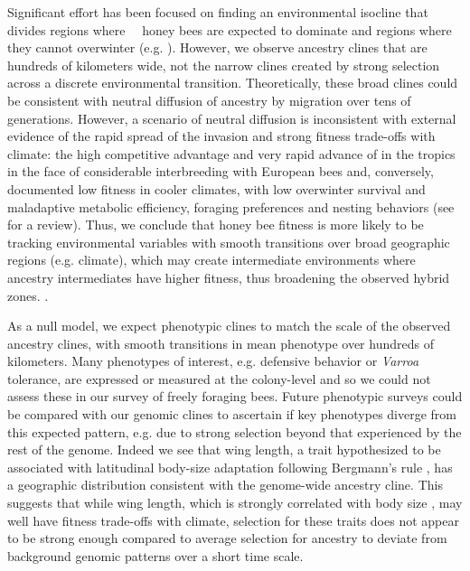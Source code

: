 Significant effort has been focused on finding an environmental isocline that divides regions where \africanized\ \hyb\ honey bees are expected to dominate and regions where they cannot overwinter (e.g. \cite{TaylorJr:1984vg, Southwick:1990cq, Sheppard:1991ep, Harrison:2006gk}). However, we observe ancestry clines that are hundreds of kilometers wide, not the narrow clines created by strong selection across a discrete environmental transition. Theoretically, these broad clines could be consistent with neutral diffusion of ancestry by migration over tens of generations. However, a scenario of neutral diffusion is inconsistent with external evidence of the rapid spread of the invasion and strong fitness trade-offs with climate: the high competitive advantage and very rapid advance of \scutellata{} in the tropics in the face of considerable interbreeding with European bees and, conversely, documented low fitness  in cooler climates, with low overwinter survival and maladaptive metabolic efficiency, foraging preferences and nesting behaviors (see \cite{Harrison:2006gk} for a review).  Thus, we conclude that honey bee fitness is more likely to be tracking environmental variables with smooth transitions over broad geographic regions (e.g. climate), which may create intermediate environments where ancestry intermediates have higher fitness, thus broadening the observed hybrid zones. .

As a null model, we expect phenotypic clines to match the scale of the observed ancestry clines, with smooth transitions in mean phenotype over hundreds of kilometers. Many phenotypes of interest, e.g. defensive behavior or \textit{Varroa} tolerance, are expressed or measured at the colony-level and so we could not assess these in our survey of freely foraging bees. Future phenotypic surveys could be compared with our genomic clines to ascertain if key phenotypes diverge from this expected pattern, e.g. due to strong selection beyond that experienced by the rest of the genome. Indeed we see that wing length, a trait hypothesized to be associated with latitudinal body-size adaptation following Bergmann's rule \cite{Daly:1991de}, has a geographic distribution consistent with the genome-wide ancestry cline. This suggests that while wing length, which is strongly correlated with body size \cite{Daly:1978hu,Rinderer:86a}, may well have fitness trade-offs with climate, selection for these traits does not appear to be strong enough compared to average selection for ancestry to deviate from background genomic patterns over a short time scale.

